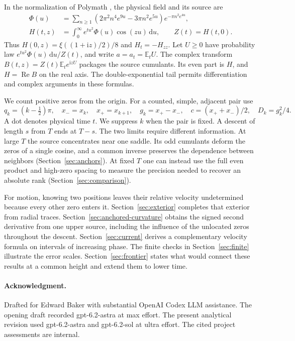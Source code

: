 \documentclass[11pt,letterpaper]{article}
\numberwithin{equation}{section}
\newcommand{\E}{\mathbb E}
\newcommand{\ii}{\mathrm i}
\newcommand{\dd}{\,\mathrm d}
\newcommand{\Real}{\operatorname{Re}}
\begin{document}
In the normalization of Polymath \cite[\S1]{Polymath2019}, the physical field and its source are
\begin{align}
 \Phi(u)&=\sum_{n\ge1}(2\pi^2n^4 e^{9u}-3\pi n^2e^{5u})e^{-\pi n^2 e^{4u}},\nonumber\\
 H(t,z)&=\int_0^\infty e^{tu^2}\Phi(u)\cos(zu)\dd u,\qquad Z(t)=H(t,0).
 \label{eq:field}
\end{align}
Thus \(H(0,z)=\xi((1+\ii z)/2)/8\) and \(H_t=-H_{zz}\). Let \(U\ge0\) have probability law \(e^{tu^2}\Phi(u)\dd u/Z(t)\), and write \(a=a_t=\E_t U\).
The complex transform \(B(t,z)=Z(t)\E_t e^{\ii zU}\) packages the source cumulants. Its even part is \(H\), and \(H=\Real B\) on the real axis. The double-exponential tail permits differentiation and complex arguments in these formulas.

We count positive zeros from the origin. For a counted, simple, adjacent pair use
\[
 q_k=(k-\tfrac12)\pi,\quad x_-=x_k,\quad x_+=x_{k+1},\quad
 g_k=x_+-x_-,\quad c=(x_++x_-)/2,\quad D_k=g_k^2/4 .
\]
A dot denotes physical time \(t\). We suppress \(k\) when the pair is fixed. A descent of length \(s\) from \(T\) ends at \(T-s\).
The two limits require different information. At large \(T\) the source concentrates near one saddle. Its odd cumulants deform the zeros of a single cosine, and a common inverse preserves the dependence between neighbors (Section~\ref{sec:anchors}). At fixed \(T\) one can instead use the full even product and high-zero spacing to measure the precision needed to recover an absolute rank (Section~\ref{sec:comparison}).

For motion, knowing two positions leaves their relative velocity undetermined because every other zero enters it. Section~\ref{sec:exterior} completes that exterior from radial traces. Section~\ref{sec:anchored-curvature} obtains the signed second derivative from one upper source, including the influence of the unlocated zeros throughout the descent. Section~\ref{sec:current} derives a complementary velocity formula on intervals of increasing phase. The finite checks in Section~\ref{sec:finite} illustrate the error scales. Section~\ref{sec:frontier} states what would connect these results at a common height and extend them to lower time.








\paragraph{Acknowledgment.} Drafted for Edward Baker with substantial OpenAI Codex LLM assistance. The opening draft recorded gpt-6.2-astra at max effort. The present analytical revision used gpt-6.2-astra and gpt-6.2-sol at ultra effort. The cited project assessments are internal.
\begingroup
\small


\endgroup
\end{document}
